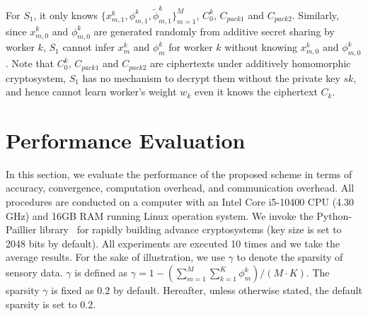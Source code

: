 \documentclass[conference]{IEEEtran}
\begin{document}
For $S_1$, it only knows $\{x_{m,1}^k, \phi_{m,1}^k, \tilde{\phi}_{m,1}^k\}_{m=1}^M$, $C_0^k$, $C_{pack1}$ and $C_{pack2}$.
Similarly, since $x_{m,0}^k$ and $\phi_{m,0}^k$ are generated randomly from additive secret sharing by worker $k$, $S_1$ cannot infer $x_m^k$ and $\phi_m^k$ for worker $k$ without knowing $x_{m,0}^k$ and $\phi_{m,0}^k$.
Note that $C_0^k$, $C_{pack1}$ and $C_{pack2}$ are ciphertexts under additively homomorphic cryptosystem, $S_1$ has no mechanism to decrypt them without the private key $sk$, and hence cannot learn worker's weight $w_k$ even it knows the ciphertext $C_k$.

\section{Performance Evaluation}\label{sec7}
In this section, we evaluate the performance of the proposed scheme in terms of accuracy, convergence, computation overhead, and communication overhead.
All procedures are conducted on a computer with an Intel Core i5-10400 CPU (4.30 GHz) and 16GB RAM running Linux operation system.
We invoke the Python-Paillier library~\cite{PythonPaillier} for rapidly building advance cryptosystems (key size is set to 2048 bits by default).
All experiments are executed 10 times and we take the average results.
For the sake of illustration, we use $\gamma$ to denote the sparsity of sensory data.
$\gamma$ is defined as $\gamma = 1 - (\sum_{m=1}^M\sum_{k=1}^K\phi_m^k) / (M\cdot K)$.
The sparsity $\gamma$ is fixed as 0.2 by default.
Hereafter, unless otherwise stated, the default sparsity is set to 0.2.
\end{document}
